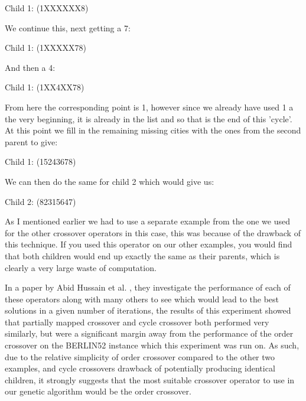 \documentclass[11pt,a4paper,titlepage]{article}
\begin{document}
\begin{center}\Large
Child 1: (1XXXXXX8)\\
\end{center}

We continue this, next getting a 7:

\begin{center}\Large
Child 1: (1XXXXX78)\\
\end{center}

And then a 4:

\begin{center}\Large
Child 1: (1XX4XX78)\\
\end{center}

From here the corresponding point is 1, however since we already have used 1 a the very beginning, it is already in the list and so that is the end of this 'cycle'. At this point we fill in the remaining missing cities with the ones from the second parent to give:

 \begin{center}\Large
Child 1: (15243678)\\
\end{center}

We can then do the same for child 2 which would give us:

\begin{center}\Large
Child 2: (82315647)\\
\end{center}

As I mentioned earlier we had to use a separate example from the one we used for the other crossover operators in this case, this was because of the drawback of this technique. If you used this operator on our other examples, you would find that both children would end up exactly the same as their parents, which is clearly a very large waste of computation.

In a paper by Abid Hussain et al. \cite{GACrossoverPerformance}, they investigate the performance of each of these operators along with many others to see which would lead to the best solutions in a given number of iterations, the results of this experiment showed that partially mapped crossover and cycle crossover both performed very similarly, but were a significant margin away from the performance of the order crossover on the BERLIN52 instance which this experiment was run on. As such, due to the relative simplicity of order crossover compared to the other two examples, and cycle crossovers drawback of potentially producing identical children, it strongly suggests that the most suitable crossover operator to use in our genetic algorithm would be the order crossover.
\end{document}
